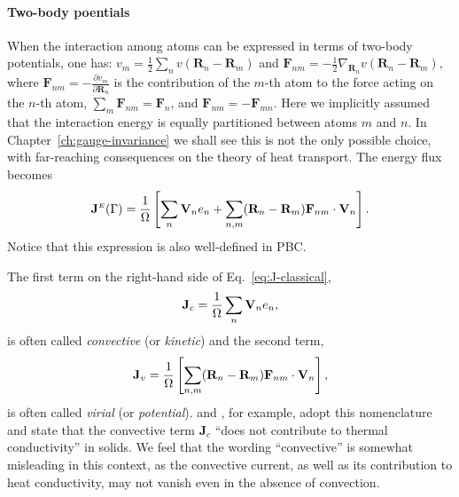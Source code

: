 \begin{LEtext}
\paragraph{Two-body poentials}
When the interaction among atoms can be expressed in terms of two-body potentials, one has: $v_m=\frac{1}{2}\sum_n v(\mathbf{R}_n- \mathbf{R}_m)$ and $\mathbf{F}_{n m} = - \frac{1}{2} \nabla_{\mathbf{R}_n} v(\mathbf{R}_n- \mathbf{R}_m)$, where $\mathbf{F}_{n m} = - \frac{\partial v_m}{\partial \mathbf{R}_n}$ is the contribution of the $m$-th atom to the force acting on the $n$-th atom, $\sum_m \mathbf{F}_{n m} = \mathbf{F}_{n}$, and $\mathbf{F}_{n m} = -\mathbf{F}_{m n}$. 
Here we implicitly assumed that the interaction energy is equally partitioned between atoms $m$ and $n$. In Chapter~\ref{ch:gauge-invariance} we shall see this is not the only possible choice, with far-reaching consequences on the theory of heat transport.
The energy flux becomes
\begin{equation}
    \mathbf{J}^\smallE(\rGamma) =
       \frac{1}{\rOmega} \left[ \sum_n \mathbf{V}_n e_n + \sum_{n,m} (\mathbf{R}_n-\mathbf{R}_m) \mathbf{F}_{n m} \cdot \mathbf{V}_n \right]. \label{eq:J-classical-2body}
\end{equation}
Notice that this expression is also well-defined in PBC.

The first term on the right-hand side of Eq.~\eqref{eq:J-classical},
\begin{equation}
    \mathbf{J}_c = \frac{1}{\rOmega} \sum_n \mathbf{V}_n e_n , \label{eq:J-convective}
\end{equation}
is often called \emph{convective} (or \emph{kinetic}) and the second term,
\begin{equation}
    \mathbf{J}_v = \frac{1}{\rOmega} \left[ \sum_{n,m} (\mathbf{R}_n-\mathbf{R}_m) \mathbf{F}_{n m} \cdot \mathbf{V}_n \right], \label{eq:J-virial}
\end{equation}
is often called \emph{virial} (or \emph{potential}).
\citeauthor{Fan2015} and \citeauthor{Carbogno:2017gc}, for example, adopt this nomenclature and state that the convective term $\mathbf{J}_c$ ``does not contribute to thermal conductivity'' in solids. 
We feel that the wording ``convective'' is somewhat misleading in this context, as the convective current, as well as its contribution to heat conductivity, may not vanish even in the absence of convection.


\end{LEtext}
